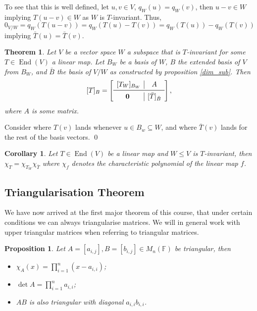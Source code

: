 \documentclass[
]{article}
\newtheorem{theorem}{Theorem}
\newtheorem{prop}{Proposition}[section]
\newtheorem{corollary}{Corollary}[theorem]
\theoremstyle{definition}
\begin{document}
To see that this is well defined, let \(u, v \in V\),
\(q_W(u) = q_W(v)\), then \(u - v \in W\) implying \(T(u - v) \in W\) as
\(W\) is \(T\)-invariant. Thus,
\(0_{V / W} = q_W(T(u - v)) = q_W(T(u) - T(v)) = q_W(T(u)) - q_W(T(v))\)
implying \(\bar{T}(u) = \bar{T}(v)\).

\begin{theorem}\label{blocks_quotient}
  Let \(V\) be a vector space \(W\) a subspace that is \(T\)-invariant for some 
  \(T \in \mathop{\mathrm{End}}(V)\) a linear map. Let \(B_W\) be a basis of \(W\), \(B\) the 
  extended basis of \(V\) from \(B_W\), and \(\bar{B}\) the basis of \(V / W\) 
  as constructed by proposition \ref{dim_sub}. Then 
  \[[T]_B = 
    \left[
    \begin{array}{c|c}
      [T_W]_{B_W} & A \\
      \midrule
      \mathbf{0} & [\bar{T}]_{\bar{B}}
    \end{array}
    \right],
  \]
  where \(A\) is some matrix.
\end{theorem}
\proof

Consider where \(T(v)\) lands whenever \(u \in B_w \subseteq W\), and
where \(\bar{T}(v)\) lands for the rest of the basis vectors. \qed

\begin{corollary}\label{prod_char}
  Let \(T \in \mathop{\mathrm{End}}(V)\) be a linear map and \(W \le V\) is \(T\)-invariant, 
  then \(\chi_T = \chi_{T_W} \chi_{\bar{T}}\) where \(\chi_f\) denotes the 
  characteristic polynomial of the linear map \(f\). 
\end{corollary}

\hypertarget{triangularisation-theorem}{%
\subsection{Triangularisation Theorem}\label{triangularisation-theorem}}

We have now arrived at the first major theorem of this course, that
under certain conditions we can always triangularise matrices. We will
in general work with upper triangular matrices when referring to
triangular matrices.

\begin{prop}
  Let \(A = [a_{i, j}], B = [b_{i, j}] \in M_n(\mathbb{F})\) be triangular, then 
  \begin{itemize}
    \item \(\chi_A(x) = \prod_{i = 1}^n (x - a_{i, i})\);
    \item \(\det A = \prod_{i = 1}^n a_{i, i}\);
    \item \(AB\) is also triangular with diagonal \(a_{i, i}b_{i, i}\).
  \end{itemize}
\end{prop}
\end{document}
